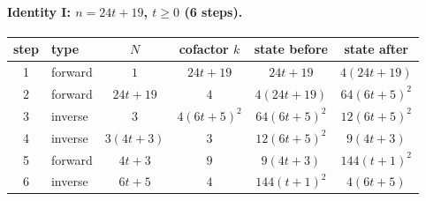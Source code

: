 \paragraph{Identity I: $n=24t+19$, $t\ge 0$ (6 steps).}
\begin{center}\footnotesize
\begin{tabular}{@{}clcccc@{}}\toprule
step & type & $N$ & cofactor $k$ & state before & state after \\ \midrule
1 & forward & $1$ & $24 t + 19$ & $24 t + 19$ & $4 \left(24 t + 19\right)$ \\
2 & forward & $24 t + 19$ & $4$ & $4 \left(24 t + 19\right)$ & $64 \left(6 t + 5\right)^{2}$ \\
3 & inverse & $3$ & $4 \left(6 t + 5\right)^{2}$ & $64 \left(6 t + 5\right)^{2}$ & $12 \left(6 t + 5\right)^{2}$ \\
4 & inverse & $3 \left(4 t + 3\right)$ & $3$ & $12 \left(6 t + 5\right)^{2}$ & $9 \left(4 t + 3\right)$ \\
5 & forward & $4 t + 3$ & $9$ & $9 \left(4 t + 3\right)$ & $144 \left(t + 1\right)^{2}$ \\
6 & inverse & $6 t + 5$ & $4$ & $144 \left(t + 1\right)^{2}$ & $4 \left(6 t + 5\right)$ \\
\bottomrule\end{tabular}\end{center}
